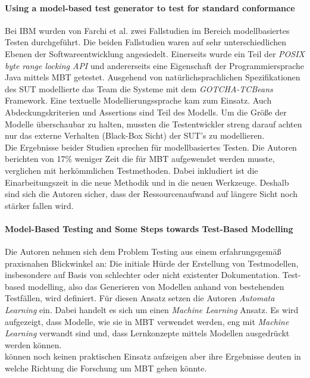 \paragraph{Using a model-based test generator to test for standard conformance\cite{farchi_using_2002}}\label{sec:ibm_fallstudie}
Bei IBM wurden von Farchi et al. zwei Fallstudien im Bereich modellbasiertes Testen durchgeführt. Die beiden Fallstudien waren auf sehr unterschiedlichen Ebenen der Softwareentwicklung angesiedelt. Einerseits wurde ein Teil der \textit{POSIX byte range locking API}\cite{posix_2008} und andererseits eine Eigenschaft der Programmiersprache Java mittels \Gls{MBT} getestet. Ausgehend von natürlichsprachlichen Spezifikationen des \Gls{SUT} modellierte das Team die Systeme mit dem \textit{GOTCHA-TCBeans} Framework. Eine textuelle Modellierungssprache kam zum Einsatz. Auch Abdeckungskriterien und Assertions sind Teil des Modells. Um die Größe der Modelle überschaubar zu halten, mussten die Testentwickler streng darauf achten nur das externe Verhalten (Black-Box Sicht) der SUT's zu modellieren.\\
Die Ergebnisse beider Studien sprechen für modellbasiertes Testen. Die Autoren berichten von 17\% weniger Zeit die für \Gls{MBT} aufgewendet werden musste, verglichen mit herkömmlichen Testmethoden. Dabei inkludiert ist die Einarbeitungszeit in die neue Methodik und in die neuen Werkzeuge. Deshalb sind sich die Autoren sicher, dass der Ressourcenaufwand auf längere Sicht noch stärker fallen wird.

\paragraph{Model-Based Testing and Some Steps towards Test-Based Modelling\cite{tretmans_model-based_2011}} \label{sec:test_based_modelling} Die Autoren nehmen sich dem Problem Testing aus einem erfahrungsgemäß praxisnahen Blickwinkel an: Die initiale Hürde der Erstellung von Testmodellen, insbesondere auf Basis von schlechter oder nicht existenter Dokumentation. Test-based modelling, also das Generieren von Modellen anhand von bestehenden Testfällen, wird definiert. Für diesen Ansatz setzen die Autoren \textit{Automata Learning} ein. Dabei handelt es sich um einen \textit{Machine Learning} Ansatz\cite{narendra_learning_1974}. Es wird aufgezeigt, dass Modelle, wie sie in \Gls{MBT} verwendet werden, eng mit \textit{Machine Learning} verwandt sind und, dass Lernkonzepte mittels Modellen ausgedrückt werden können.\\
\citeauthor{tretmans_model-based_2011} können noch keinen praktischen Einsatz aufzeigen aber ihre Ergebnisse deuten in welche Richtung die Forschung um \Gls{MBT} gehen könnte.

